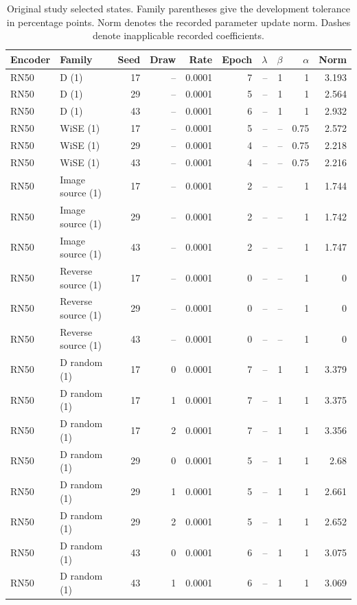 \begin{table}[t]
\centering
\scriptsize
\setlength{\tabcolsep}{3pt}
\begin{tabular}{llrrrrrrrr}
\toprule
Encoder & Family & Seed & Draw & Rate & Epoch & $\lambda$ & $\beta$ & $\alpha$ & Norm\\
\midrule
RN50 & D (1) & 17 & -- & 0.0001 & 7 & -- & 1 & 1 & 3.193\\
RN50 & D (1) & 29 & -- & 0.0001 & 5 & -- & 1 & 1 & 2.564\\
RN50 & D (1) & 43 & -- & 0.0001 & 6 & -- & 1 & 1 & 2.932\\
RN50 & WiSE (1) & 17 & -- & 0.0001 & 5 & -- & -- & 0.75 & 2.572\\
RN50 & WiSE (1) & 29 & -- & 0.0001 & 4 & -- & -- & 0.75 & 2.218\\
RN50 & WiSE (1) & 43 & -- & 0.0001 & 4 & -- & -- & 0.75 & 2.216\\
RN50 & Image source (1) & 17 & -- & 0.0001 & 2 & -- & -- & 1 & 1.744\\
RN50 & Image source (1) & 29 & -- & 0.0001 & 2 & -- & -- & 1 & 1.742\\
RN50 & Image source (1) & 43 & -- & 0.0001 & 2 & -- & -- & 1 & 1.747\\
RN50 & Reverse source (1) & 17 & -- & 0.0001 & 0 & -- & -- & 1 & 0\\
RN50 & Reverse source (1) & 29 & -- & 0.0001 & 0 & -- & -- & 1 & 0\\
RN50 & Reverse source (1) & 43 & -- & 0.0001 & 0 & -- & -- & 1 & 0\\
RN50 & D random (1) & 17 & 0 & 0.0001 & 7 & -- & 1 & 1 & 3.379\\
RN50 & D random (1) & 17 & 1 & 0.0001 & 7 & -- & 1 & 1 & 3.375\\
RN50 & D random (1) & 17 & 2 & 0.0001 & 7 & -- & 1 & 1 & 3.356\\
RN50 & D random (1) & 29 & 0 & 0.0001 & 5 & -- & 1 & 1 & 2.68\\
RN50 & D random (1) & 29 & 1 & 0.0001 & 5 & -- & 1 & 1 & 2.661\\
RN50 & D random (1) & 29 & 2 & 0.0001 & 5 & -- & 1 & 1 & 2.652\\
RN50 & D random (1) & 43 & 0 & 0.0001 & 6 & -- & 1 & 1 & 3.075\\
RN50 & D random (1) & 43 & 1 & 0.0001 & 6 & -- & 1 & 1 & 3.069\\
\bottomrule
\end{tabular}
\caption{Original study selected states. Family parentheses give the development tolerance in percentage points. Norm denotes the recorded parameter update norm. Dashes denote inapplicable recorded coefficients.}\label{tab:originalselected60}
\end{table}


